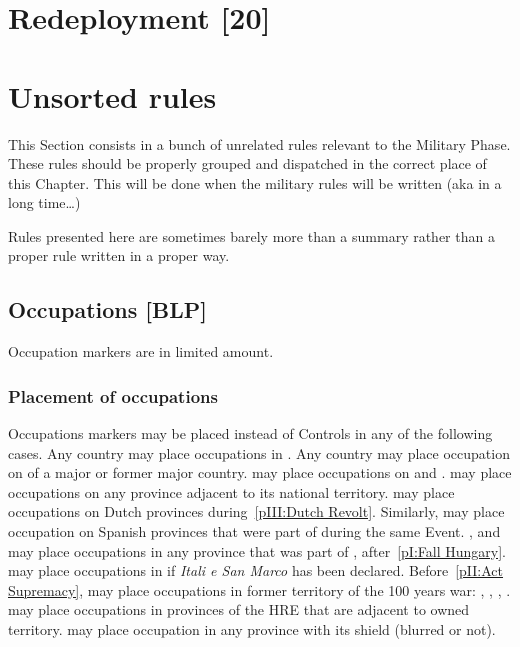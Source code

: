 \section{Redeployment [20]}

\section{Unsorted rules}
\begin{designnote}
  This Section consists in a bunch of unrelated rules relevant to the Military
  Phase. These rules should be properly grouped and dispatched in the correct
  place of this Chapter. This will be done when the military rules will be
  written (aka in a long time\ldots)

  Rules presented here are sometimes barely more than a summary rather than a
  proper rule written in a proper way.
\end{designnote}

\subsection{Occupations [BLP]}
\aparag Occupation markers are in limited amount.

\subsubsection{Placement of occupations}
\aparag Occupations markers may be placed instead of Controls in any
of the following cases.
\bparag Any country may place occupations in \continentCaraibes.
\bparag[] [TBD] Any country may place occupation on \TP of a major or
former major country.
\bparag \POR may place occupations on \paysOman and \paysAden.
\bparag \RUS may place occupations on any province adjacent to its
national territory.
\bparag \HIS may place occupations on Dutch provinces
during~\ref{pIII:Dutch Revolt}. Similarly, \HOL may place occupation
on Spanish provinces that were part of \paysBourgogne during the same
Event.
\bparag \TUR, \AUS and \POL may place occupations in any province that
was part of \paysHongrie, after~\ref{pI:Fall Hungary}.
\bparag[] [TBD] \VEN may place occupations in \regionItalie if
\emph{Itali e San Marco} has been declared.
\bparag[] [TBD] Before~\ref{pII:Act Supremacy}, \ANG may place
occupations in former territory of the 100 years war:
\provinceGuyenne, \provinceQuercy, \provincePoitou, \provincePicardie.
\bparag \FRA may place occupations in provinces of the HRE that are
adjacent to owned territory.
\bparag \paysSavoie may place occupation in any province with its
shield (blurred or not).


